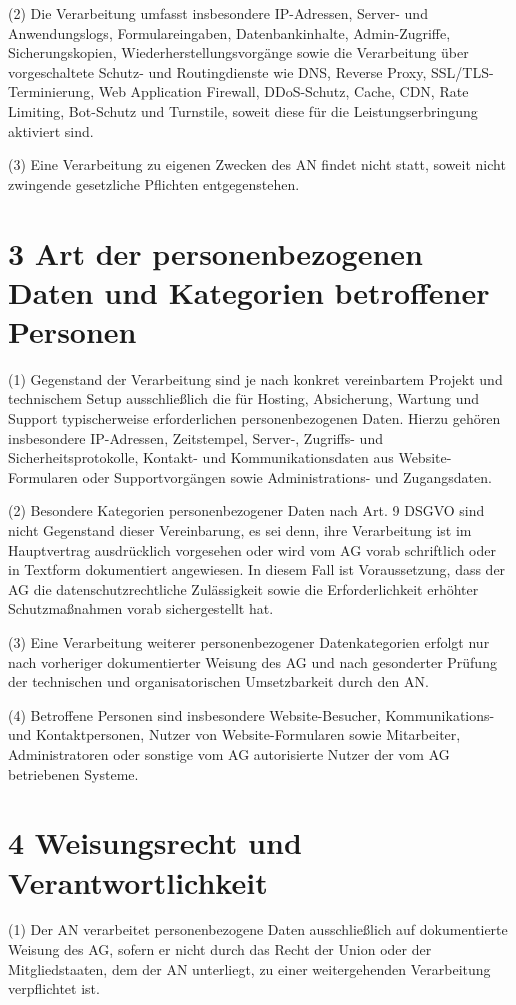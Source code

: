 \documentclass[11pt,a4paper]{article}
\begin{document}
(2) Die Verarbeitung umfasst insbesondere IP-Adressen, Server- und Anwendungslogs, Formulareingaben, Datenbankinhalte, Admin-Zugriffe, Sicherungskopien, Wiederherstellungsvorgänge sowie die Verarbeitung über vorgeschaltete Schutz- und Routingdienste wie DNS, Reverse Proxy, SSL/TLS-Terminierung, Web Application Firewall, DDoS-Schutz, Cache, CDN, Rate Limiting, Bot-Schutz und Turnstile, soweit diese für die Leistungserbringung aktiviert sind.

(3) Eine Verarbeitung zu eigenen Zwecken des AN findet nicht statt, soweit nicht zwingende gesetzliche Pflichten entgegenstehen.

\section*{3 Art der personenbezogenen Daten und Kategorien betroffener Personen}
(1) Gegenstand der Verarbeitung sind je nach konkret vereinbartem Projekt und technischem Setup ausschließlich die für Hosting, Absicherung, Wartung und Support typischerweise erforderlichen personenbezogenen Daten. Hierzu gehören insbesondere IP-Adressen, Zeitstempel, Server-, Zugriffs- und Sicherheitsprotokolle, Kontakt- und Kommunikationsdaten aus Website-Formularen oder Supportvorgängen sowie Administrations- und Zugangsdaten.

(2) Besondere Kategorien personenbezogener Daten nach Art. 9 DSGVO sind nicht Gegenstand dieser Vereinbarung, es sei denn, ihre Verarbeitung ist im Hauptvertrag ausdrücklich vorgesehen oder wird vom AG vorab schriftlich oder in Textform dokumentiert angewiesen. In diesem Fall ist Voraussetzung, dass der AG die datenschutzrechtliche Zulässigkeit sowie die Erforderlichkeit erhöhter Schutzmaßnahmen vorab sichergestellt hat.

(3) Eine Verarbeitung weiterer personenbezogener Datenkategorien erfolgt nur nach vorheriger dokumentierter Weisung des AG und nach gesonderter Prüfung der technischen und organisatorischen Umsetzbarkeit durch den AN.

(4) Betroffene Personen sind insbesondere Website-Besucher, Kommunikations- und Kontaktpersonen, Nutzer von Website-Formularen sowie Mitarbeiter, Administratoren oder sonstige vom AG autorisierte Nutzer der vom AG betriebenen Systeme.

\section*{4 Weisungsrecht und Verantwortlichkeit}
(1) Der AN verarbeitet personenbezogene Daten ausschließlich auf dokumentierte Weisung des AG, sofern er nicht durch das Recht der Union oder der Mitgliedstaaten, dem der AN unterliegt, zu einer weitergehenden Verarbeitung verpflichtet ist.
\end{document}
